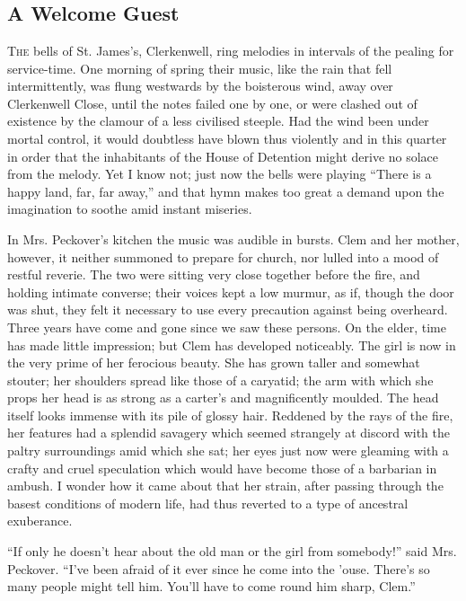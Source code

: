 \part{}

\chapter{A Welcome Guest}

\textsc{The} bells of St. James's, Clerkenwell, ring melodies in
intervals of the pealing for service-time. One morning of spring their
music, like the rain that fell intermittently, was flung westwards by
the boisterous wind, away over Clerkenwell Close, until the notes failed
one by one, or were clashed out of existence by the clamour of a less
civilised steeple. Had the wind been under mortal control, it would
doubtless have blown thus violently and in this quarter in order that
the inhabitants of the House of Detention might derive no solace from
the melody. Yet I know not; just now the bells were {}playing ``There is
a happy land, far, far away,'' and that hymn makes too great a demand
upon the imagination to soothe amid instant miseries.

In Mrs. Peckover's kitchen the music was audible in bursts. Clem and her
mother, however, it neither summoned to prepare for church, nor lulled
into a mood of restful reverie. The two were sitting very close together
before the fire, and holding intimate converse; their voices kept a low
murmur, as if, though the door was shut, they felt it necessary to use
every precaution against being overheard. Three years have come and gone
since we saw these persons. On the elder, time has made little
impression; but Clem has developed noticeably. The girl is now in the
very prime of her ferocious beauty. She has grown taller and somewhat
stouter; her shoulders spread like those of a caryatid; the arm with
which she props her head is as strong as a carter's and magnificently
moulded. The head itself looks immense with its pile of glossy hair.
{}Reddened by the rays of the fire, her features had a splendid savagery
which seemed strangely at discord with the paltry surroundings amid
which she sat; her eyes just now were gleaming with a crafty and cruel
speculation which would have become those of a barbarian in ambush. I
wonder how it came about that her strain, after passing through the
basest conditions of modern life, had thus reverted to a type of
ancestral exuberance.

``If only he doesn't hear about the old man or the girl from somebody!''
said Mrs. Peckover. ``I've been afraid of it ever since he come into the
'ouse. There's so many people might tell him. You'll have to come round
him sharp, Clem.''


